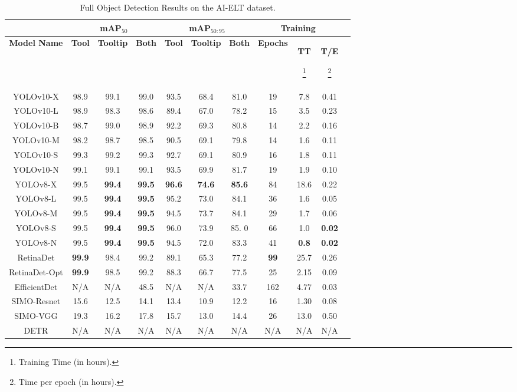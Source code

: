 \begin{table*}[h]
\centering
\caption{Full Object Detection Results on the AI-ELT dataset.}
\label{fig:aieltresults}
\begin{tabular}{|c|c|c|c|c|c|c|c|c|c|c|}
\hline
\multicolumn{1}{|c|}{} & \multicolumn{3}{c|}{\textbf{mAP$_{50}$}} & \multicolumn{3}{c|}{\textbf{mAP$_{50:95}$}} & \multicolumn{3}{c|}{\textbf{Training}} \\
\hline
\textbf{Model Name} & \textbf{Tool} & \textbf{Tooltip} & \textbf{Both} & \textbf{Tool} & \textbf{Tooltip} & \textbf{Both} & \textbf{Epochs} & \textbf{TT}\begin{scriptsize}\footnote{Training Time (in hours).}\end{scriptsize} & \textbf{T/E}\begin{scriptsize}\footnote{Time per epoch (in hours).}\end{scriptsize} \\ 
\hline
YOLOv10-X & 98.9 & 99.1 & 99.0 & 93.5 & 68.4 & 81.0 & 19 & 7.8 & 0.41 \\ 
YOLOv10-L & 98.9 & 98.3 & 98.6 & 89.4 & 67.0 & 78.2 & 15 & 3.5 & 0.23 \\ 
YOLOv10-B & 98.7 & 99.0 & 98.9 & 92.2 & 69.3 & 80.8 & 14 & 2.2 & 0.16 \\ 
YOLOv10-M & 98.2 & 98.7 & 98.5 & 90.5 & 69.1 & 79.8 & 14 & 1.6 & 0.11 \\ 
YOLOv10-S & 99.3 & 99.2 & 99.3 & 92.7 & 69.1 & 80.9 & 16 & 1.8 & 0.11 \\ 
YOLOv10-N & 99.1 & 99.1 & 99.1 & 93.5 & 69.9 & 81.7 & 19 & 1.9 & 0.10 \\ 
YOLOv8-X & 99.5 & \textbf{99.4} & \textbf{99.5} & \textbf{96.6} & \textbf{74.6} & \textbf{85.6} & 84 & 18.6 & 0.22 \\ 
YOLOv8-L & 99.5 & \textbf{99.4} & \textbf{99.5} & 95.2 & 73.0 & 84.1 & 36 & 1.6 & 0.05 \\ 
YOLOv8-M & 99.5 & \textbf{99.4} & \textbf{99.5} & 94.5 & 73.7 & 84.1 & 29 & 1.7 & 0.06 \\ 
YOLOv8-S & 99.5 & \textbf{99.4} & \textbf{99.5} & 96.0 & 73.9 & 85. 0& 66 & 1.0 & \textbf{0.02} \\ 
YOLOv8-N & 99.5 & \textbf{99.4} & \textbf{99.5} & 94.5 & 72.0 & 83.3 & 41 & \textbf{0.8} & \textbf{0.02} \\ 
RetinaDet & \textbf{99.9} & 98.4 & 99.2 & 89.1 & 65.3 & 77.2 & \textbf{99} & 25.7 & 0.26 \\ 
RetinaDet-Opt & \textbf{99.9} & 98.5 & 99.2 & 88.3 & 66.7 & 77.5 & 25 & 2.15 & 0.09 \\ 
EfficientDet & N/A & N/A & 48.5 & N/A & N/A & 33.7 & 162 & 4.77 & 0.03 \\ 
SIMO-Resnet & 15.6 & 12.5 & 14.1 & 13.4 & 10.9 & 12.2 & 16 & 1.30 & 0.08 \\ 
SIMO-VGG & 19.3 & 16.2 & 17.8 & 15.7 & 13.0 & 14.4 & 26 & 13.0 & 0.50 \\ 
DETR & N/A & N/A & N/A & N/A & N/A & N/A & N/A & N/A & N/A \\
\hline
\end{tabular}
\end{table*}


